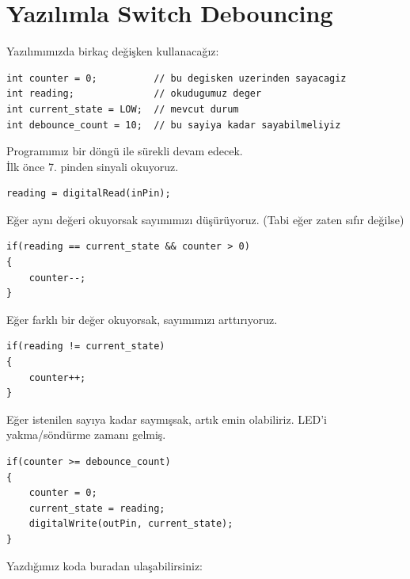 \documentclass[11pt]{article}
\begin{document}
\section{Yazılımla Switch Debouncing}
Yazılımımızda birkaç değişken kullanacağız:
\begin{lstlisting}
int counter = 0;       	  // bu degisken uzerinden sayacagiz
int reading;           	  // okudugumuz deger
int current_state = LOW;  // mevcut durum
int debounce_count = 10;  // bu sayiya kadar sayabilmeliyiz
\end{lstlisting}
Programımız bir döngü ile sürekli devam edecek.\\
İlk önce 7. pinden sinyali okuyoruz.
\begin{lstlisting}
reading = digitalRead(inPin);
\end{lstlisting}
Eğer aynı değeri okuyorsak sayımımızı düşürüyoruz. (Tabi eğer zaten sıfır değilse)
\begin{lstlisting}
if(reading == current_state && counter > 0)
{
	counter--;
}
\end{lstlisting}
Eğer farklı bir değer okuyorsak, sayımımızı arttırıyoruz.
\begin{lstlisting}
if(reading != current_state)
{
	counter++; 
}
\end{lstlisting}
Eğer istenilen sayıya kadar saymışsak, artık emin olabiliriz. LED'i yakma/söndürme zamanı gelmiş.
\begin{lstlisting}
if(counter >= debounce_count)
{
	counter = 0;
	current_state = reading;
	digitalWrite(outPin, current_state);
}
\end{lstlisting}
Yazdığımız koda buradan ulaşabilirsiniz: 
\newpage
\end{document}
